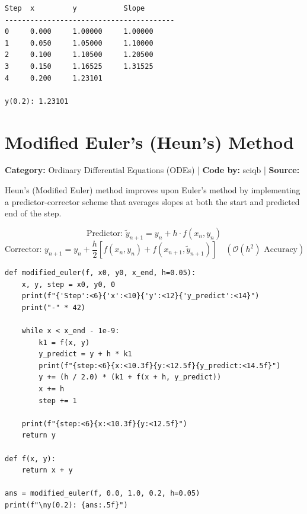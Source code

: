 \documentclass[10pt,a4paper]{report}
\begin{document}
\begin{tcolorbox}[colback=termbg,colframe=primary,title=\textbf{Program Execution Output \& Convergence Table},boxrule=1pt,arc=2mm]
\begin{lstlisting}[style=terminal_output]
Step  x         y           Slope       
----------------------------------------
0     0.000     1.00000     1.00000     
1     0.050     1.05000     1.10000     
2     0.100     1.10500     1.20500     
3     0.150     1.16525     1.31525     
4     0.200     1.23101     

y(0.2): 1.23101
\end{lstlisting}
\end{tcolorbox}

\newpage


\section{Modified Euler's (Heun's) Method}
\textbf{Category:} \textcolor{secondary}{Ordinary Differential Equations (ODEs)} \quad | \quad \textbf{Code by:} \textcolor{secondary}{sciqb} \quad | \quad \textbf{Source:} \texttt{}

Heun's (Modified Euler) method improves upon Euler's method by implementing a predictor-corrector scheme that averages slopes at both the start and predicted end of the step.

\begin{tcolorbox}[colback=theorybg,colframe=theoryframe,title=\textbf{Mathematical Theory \& Formulation},boxrule=1pt,arc=2mm]
\[
\text{Predictor: } \tilde{y}_{n+1} = y_n + h \cdot f(x_n, y_n)
\]
\[
\text{Corrector: } y_{n+1} = y_n + \frac{h}{2}\left[f(x_n, y_n) + f(x_{n+1}, \tilde{y}_{n+1})\right] \quad (\mathcal{O}(h^2) \text{ Accuracy})
\]
\end{tcolorbox}

\begin{tcolorbox}[colback=codebg,colframe=secondary,title=\textbf{Python Implementation (Step-by-Step Functions)},boxrule=1pt,arc=2mm]
\begin{lstlisting}[style=python_detailed]
def modified_euler(f, x0, y0, x_end, h=0.05):
    x, y, step = x0, y0, 0
    print(f"{'Step':<6}{'x':<10}{'y':<12}{'y_predict':<14}")
    print("-" * 42)

    while x < x_end - 1e-9:
        k1 = f(x, y)
        y_predict = y + h * k1
        print(f"{step:<6}{x:<10.3f}{y:<12.5f}{y_predict:<14.5f}")
        y += (h / 2.0) * (k1 + f(x + h, y_predict))
        x += h
        step += 1

    print(f"{step:<6}{x:<10.3f}{y:<12.5f}")
    return y

def f(x, y):
    return x + y

ans = modified_euler(f, 0.0, 1.0, 0.2, h=0.05)
print(f"\ny(0.2): {ans:.5f}")


\end{lstlisting}
\end{tcolorbox}
\end{document}
